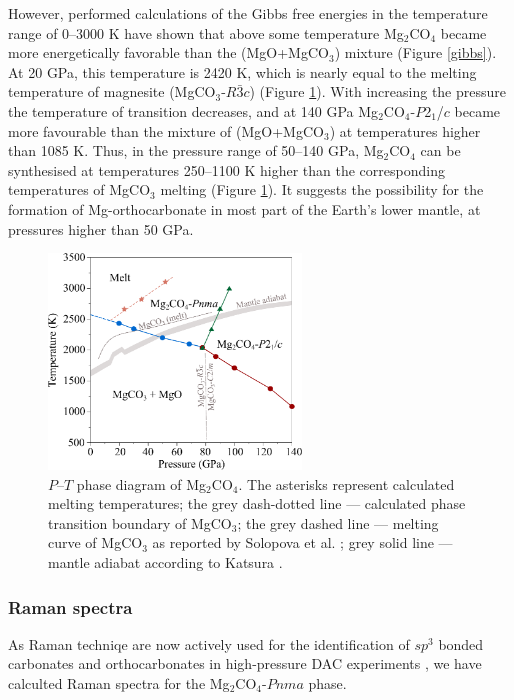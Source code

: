 \documentclass[a4paperm]{article}
\begin{document}
However, performed calculations of the Gibbs free energies in the temperature range of 0--3000 K have shown that above some temperature  Mg$_2$CO$_4$ became more energetically favorable than the (MgO+MgCO$_3$) mixture (Figure \ref{gibbs}).
At 20 GPa, this temperature is 2420 K, which is nearly equal to the melting temperature of  magnesite (MgCO$_3$-$R\bar{3}c$) \cite{solopova2015} (Figure \ref{phdia}).
With increasing the pressure the temperature of transition decreases, and at 140 GPa Mg$_2$CO$_4$-$P$2$_1$/$c$ became more favourable than the mixture of (MgO+MgCO$_3$) at temperatures higher than 1085 K.
Thus, in the pressure range of 50--140 GPa, Mg$_2$CO$_4$ can be synthesised at temperatures 250--1100 K higher than the corresponding temperatures of MgCO$_3$ melting (Figure \ref{phdia}). 
It suggests the possibility for the formation of Mg-orthocarbonate in most part of the Earth's lower mantle, at pressures higher than 50 GPa.

\begin{figure}[H]
	\centering
	\includegraphics[width=0.6\textwidth]{phdia_mg2co4}
	\caption{$P$--$T$ phase diagram of Mg$_2$CO$_4$. The asterisks represent calculated melting temperatures;  the grey dash-dotted line --- calculated phase transition boundary of MgCO$_3$; the grey dashed line --- melting curve of MgCO$_3$ as reported by Solopova et al. \cite{solopova2015}; grey solid line --- mantle adiabat according to  Katsura \cite{katsura2010}.} 
\label{phdia}
\end{figure}


\subsubsection*{Raman spectra}

As Raman techniqe are now actively used for the identification of $sp^3$ bonded carbonates and orthocarbonates in high-pressure DAC experiments \cite{lobanov2017, binck2020_mgco3}, we have calculted Raman spectra for the Mg$_2$CO$_4$-$Pnma$ phase.
\end{document}
